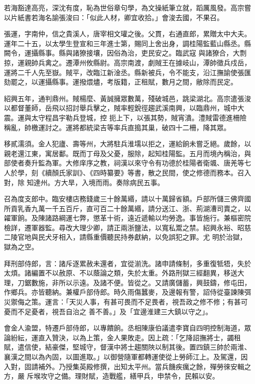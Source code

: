 \begin{pinyinscope}
 若海豁達高亮，深沈有度，恥為世俗章句學，為文操紙筆立就，蹈厲風發。高宗嘗以片紙書若海名諭張浚曰：「似此人材，卿宜收拾。」會浚去國，不果召。



 張運，字南仲，信之貴溪人，唐宰相文瓘之後。父貫，右通直郎，累贈太中大夫。運年二十五，以太學生登宣和三年進士第，賜同上舍出身，調桂陽監藍山縣丞。縣闕令，運攝縣事。縣與諸獠接壤，因俗為治，吏民安之。臨武寇
 與諸獠合，大剽掠，運親帥兵禽之。遷潭州攸縣尉。高宗南渡，劇賊王在據岐山，潭帥徵兵戍岳，運將二千人先至嶽。賊平，改臨江新淦丞。縣新被兵，令不能支，沿江撫諭使張匯劾罷之，以運攝縣事。運撥煨燼，考版籍，正租賦，數月之間，敝除而民定。



 紹興五年，通判鼎州。賊楊麼、黃誠擁眾數萬，殘破城邑，跳梁湖北。高宗遣張浚以都督董師，岳飛以招討舉兵擊之，賊率輕銳徑趨武溪南興，以臨鼎州，城中大震。運與太守程昌宇勒兵登城，控
 扼上下，以張其勢，賊宵潰。澧賊雷德進柵險稱亂，帥檄運討之。運將都統梁吉等率兵直搗其巢，破四十二柵，降其眾。



 移貳濡須。金人犯廬、壽等州，大將駐兵淮壖以拒之，運給餉未嘗乏絕。歲餘，以親老還江東，寓居鄱。既而丁母及父憂，服除，起知桂陽監。五月而境內稱治，與部使者奏升監為軍。大修庠序之教，祠漢以來守令有功德於桂陽者衛颯、唐羌等七人於學，刻《續顏氏家訓》、《四時纂要》等書，散之民間，使之修德而務本。召入對，除
 知達州。方大旱，入境而雨。奏除病民五事。



 召為度支郎中。臨安樓店務錢歲三十餘萬緡，請以十萬歸省額。戶部所儲三佛齊國所貢乳香九萬一千五百斤，直可百二十餘萬緡，請分送江、浙、荊湖漕司賣之，以糴軍餉。及陳諸路綱運七弊，懲革十術，遠近遞輸以均勞逸。事皆施行。兼樞密院檢詳，遷軍器監。尋改大理少卿，請正兩浙鹽法，以寬私鬻之禁。紹興永裕、昭慈二陵官地與民犬牙相入，請縣重價聽民持券獻納，以免誤犯之罪。尤
 明於治獄，獄為之空。



 拜刑部侍郎，言：諸斥逐累赦未還者，宜從湔洗。諸申請條制，多重復牴牾，失於太煩。諸編置不以赦原、不以蔭論之類，失於太重。外路刑獄三經翻異，移送大理，刀鋸數施，非所以示遠。及諸不便。皆從之。又請廣儲蓄，興鼓鑄，修屯田，作鄉兵。亦皆聽納。兼權戶部侍郎。時久雨傷蠶麥，及邊報有警，詔侍從臺諫陳弭災禦侮之策。運言：「天災人事，有甚可畏而不足畏者，視吾政之修不修；有甚可憂而不足憂者，視吾自治之
 善不善。」及「宜邊淮建三大鎮以守之」。



 會金人渝盟，特遷戶部侍郎，以專饋餉。丞相陳康伯議遣李寶自四明控制海道，眾論紛紜，運直入贊決，以為上策，金人果敗走。因上疏：「乞降詔撫將士，蠲租賦，遣信使，結豪傑，堅城守，督漢中將士趨關陜以制其後。置四鎮三帥於兩淮、襄漢之間以為內固，以圖進取。」以御營隨軍都轉運使從上勞師江上。及駕還，因入對，固請補外。乃授集英殿修撰，出知太平州。當兵饑疾癘之餘，殫勞徠安輯之方，嚴
 斥堠攻守之備。理財賦，造戰艦，繕甲兵，申禁令，民賴以安。




\end{pinyinscope}

